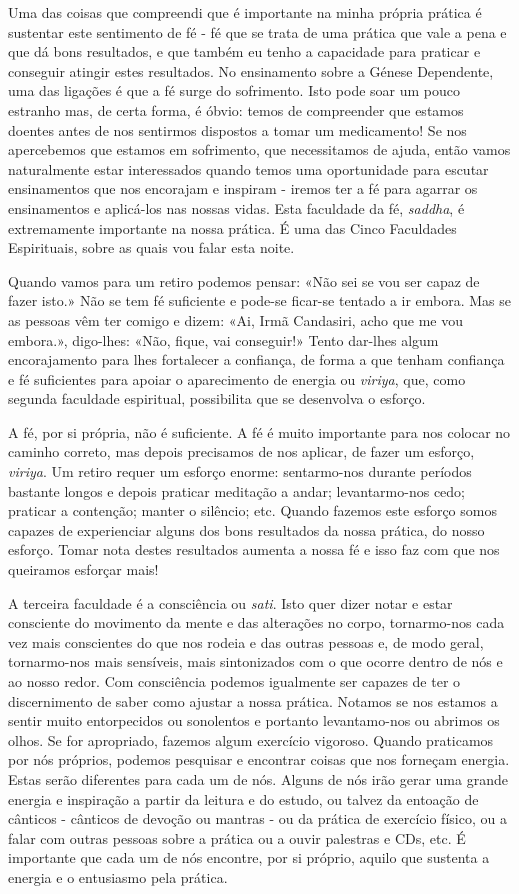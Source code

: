 Uma das coisas que compreendi que é importante na minha própria prática
é sustentar este sentimento de fé - fé que se trata de uma prática que
vale a pena e que dá bons resultados, e que também eu tenho a capacidade
para praticar e conseguir atingir estes resultados. No ensinamento sobre
a Génese Dependente, uma das ligações é que a fé surge do sofrimento.
Isto pode soar um pouco estranho mas, de certa forma, é óbvio: temos de
compreender que estamos doentes antes de nos sentirmos dispostos a tomar
um medicamento! Se nos apercebemos que estamos em sofrimento, que
necessitamos de ajuda, então vamos naturalmente estar interessados
quando temos uma oportunidade para escutar ensinamentos que nos
encorajam e inspiram - iremos ter a fé para agarrar os ensinamentos e
aplicá-los nas nossas vidas. Esta faculdade da fé, \emph{saddha}, é
extremamente importante na nossa prática. É uma das Cinco Faculdades
Espirituais, sobre as quais vou falar esta noite.

Quando vamos para um retiro podemos pensar: «Não sei se vou ser capaz de
fazer isto.» Não se tem fé suficiente e pode-se \mbox{ficar-se} tentado a ir
embora. Mas se as pessoas vêm ter comigo e dizem: «Ai, Irmã Candasiri,
acho que me vou embora.», digo-lhes: «Não, fique, vai conseguir!» Tento
dar-lhes algum encorajamento para lhes fortalecer a confiança, de forma
a que tenham confiança e fé suficientes para apoiar o aparecimento de
energia ou \emph{viriya}, que, como segunda faculdade espiritual,
possibilita que se desenvolva o esforço.

A fé, por si própria, não é suficiente. A fé é muito importante para nos
colocar no caminho correto, mas depois precisamos de nos aplicar, de
fazer um esforço, \emph{viriya}. Um retiro requer um esforço enorme:
sentarmo-nos durante períodos bastante longos e depois praticar
meditação a andar; levantarmo-nos cedo; praticar a contenção; manter o
silêncio; etc. Quando fazemos este esforço somos capazes de experienciar
alguns dos bons resultados da nossa prática, do nosso esforço. Tomar
nota destes resultados aumenta a nossa fé e isso faz com que nos
queiramos esforçar mais!

A terceira faculdade é a consciência ou \emph{sati}. Isto quer dizer
notar e estar consciente do movimento da mente e das alterações no
corpo, tornarmo-nos cada vez mais conscientes do que nos rodeia e das
outras pessoas e, de modo geral, tornarmo-nos mais sensíveis, mais
sintonizados com o que ocorre dentro de nós e ao nosso redor. Com
consciência podemos igualmente ser capazes de ter o discernimento de
saber como ajustar a nossa prática. Notamos se nos estamos a sentir
muito entorpecidos ou sonolentos e portanto levantamo-nos ou abrimos os
olhos. Se for apropriado, fazemos algum exercício vigoroso. Quando
praticamos por nós próprios, podemos pesquisar e encontrar coisas que
nos forneçam energia. Estas serão diferentes para cada um de nós. Alguns
de nós irão gerar uma grande energia e inspiração a partir da leitura e
do estudo, ou talvez da entoação de cânticos - cânticos de devoção ou
mantras - ou da prática de exercício físico, ou a falar com outras
pessoas sobre a prática ou a ouvir palestras e CDs, etc. É importante
que cada um de nós encontre, por si próprio, aquilo que sustenta a
energia e o entusiasmo pela prática.

